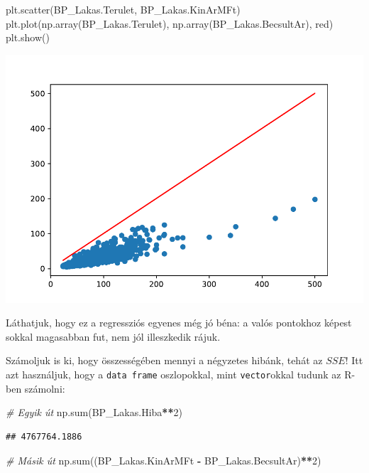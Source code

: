 \documentclass[
]{book}
\newenvironment{Shaded}{\begin{snugshade}}{\end{snugshade}}
\newcommand{\BuiltInTok}[1]{#1}
\newcommand{\CommentTok}[1]{\textcolor[rgb]{0.56,0.35,0.01}{\textit{#1}}}
\newcommand{\DecValTok}[1]{\textcolor[rgb]{0.00,0.00,0.81}{#1}}
\newcommand{\NormalTok}[1]{#1}
\newcommand{\OperatorTok}[1]{\textcolor[rgb]{0.81,0.36,0.00}{\textbf{#1}}}
\newcommand{\StringTok}[1]{\textcolor[rgb]{0.31,0.60,0.02}{#1}}
\begin{document}
\begin{Shaded}
\begin{Highlighting}[]
\NormalTok{plt.scatter(BP\_Lakas.Terulet, BP\_Lakas.KinArMFt)}
\NormalTok{plt.plot(np.array(BP\_Lakas.Terulet),}
\NormalTok{         np.array(BP\_Lakas.BecsultAr), }\StringTok{\textquotesingle{}red\textquotesingle{}}\NormalTok{)}
\NormalTok{plt.show()}
\end{Highlighting}
\end{Shaded}

\includegraphics{_main_files/figure-latex/unnamed-chunk-386-39.pdf}

Láthatjuk, hogy ez a regressziós egyenes még jó béna: a valós pontokhoz képest sokkal magasabban fut, nem jól illeszkedik rájuk.

Számoljuk is ki, hogy összességében mennyi a négyzetes hibánk, tehát az \(SSE\)! Itt azt használjuk, hogy a \texttt{data\ frame} oszlopokkal, mint \texttt{vector}okkal tudunk az R-ben számolni:

\begin{Shaded}
\begin{Highlighting}[]
\CommentTok{\# Egyik út}
\NormalTok{np.}\BuiltInTok{sum}\NormalTok{(BP\_Lakas.Hiba}\OperatorTok{**}\DecValTok{2}\NormalTok{)}
\end{Highlighting}
\end{Shaded}

\begin{verbatim}
## 4767764.1886
\end{verbatim}

\begin{Shaded}
\begin{Highlighting}[]
\CommentTok{\# Másik út}
\NormalTok{np.}\BuiltInTok{sum}\NormalTok{((BP\_Lakas.KinArMFt }\OperatorTok{{-}}\NormalTok{ BP\_Lakas.BecsultAr)}\OperatorTok{**}\DecValTok{2}\NormalTok{)}
\end{Highlighting}
\end{Shaded}
\end{document}

